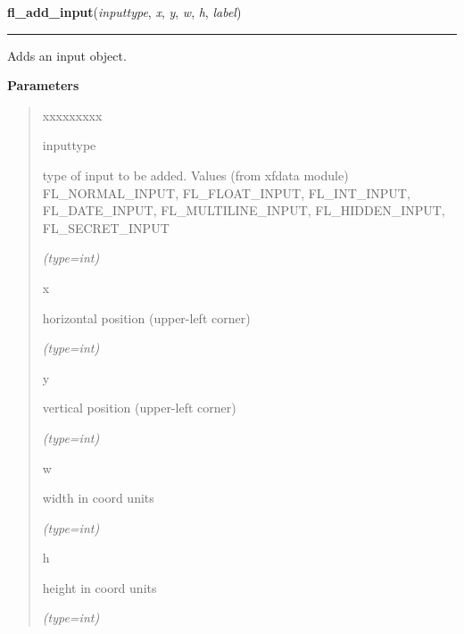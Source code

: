     \label{xformslib:flinput:fl_add_input}

    \vspace{0.5ex}

\hspace{.8\funcindent}\begin{boxedminipage}{\funcwidth}

    \raggedright \textbf{fl\_add\_input}(\textit{inputtype}, \textit{x}, \textit{y}, \textit{w}, \textit{h}, \textit{label})

    \vspace{-1.5ex}

    \rule{\textwidth}{0.5\fboxrule}
\setlength{\parskip}{2ex}
    Adds an input object.

\setlength{\parskip}{1ex}
      \textbf{Parameters}
      \vspace{-1ex}

      \begin{quote}
        \begin{Ventry}{xxxxxxxxx}

          \item[inputtype]

          type of input to be added. Values (from xfdata module) 
          FL\_NORMAL\_INPUT, FL\_FLOAT\_INPUT, FL\_INT\_INPUT, 
          FL\_DATE\_INPUT, FL\_MULTILINE\_INPUT, FL\_HIDDEN\_INPUT, 
          FL\_SECRET\_INPUT

            {\it (type=int)}

          \item[x]

          horizontal position (upper-left corner)

            {\it (type=int)}

          \item[y]

          vertical position (upper-left corner)

            {\it (type=int)}

          \item[w]

          width in coord units

            {\it (type=int)}

          \item[h]

          height in coord units

            {\it (type=int)}


\end{Ventry}
\end{quote}
\end{boxedminipage}
